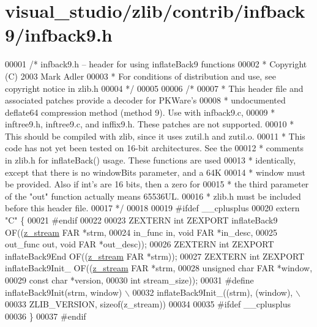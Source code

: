 \hypertarget{visual__studio_2zlib_2contrib_2infback9_2infback9_8h_source}{}\section{visual\+\_\+studio/zlib/contrib/infback9/infback9.h}
\label{visual__studio_2zlib_2contrib_2infback9_2infback9_8h_source}

\begin{DoxyCode}
00001 \textcolor{comment}{/* infback9.h -- header for using inflateBack9 functions}
00002 \textcolor{comment}{ * Copyright (C) 2003 Mark Adler}
00003 \textcolor{comment}{ * For conditions of distribution and use, see copyright notice in zlib.h}
00004 \textcolor{comment}{ */}
00005 
00006 \textcolor{comment}{/*}
00007 \textcolor{comment}{ * This header file and associated patches provide a decoder for PKWare's}
00008 \textcolor{comment}{ * undocumented deflate64 compression method (method 9).  Use with infback9.c,}
00009 \textcolor{comment}{ * inftree9.h, inftree9.c, and inffix9.h.  These patches are not supported.}
00010 \textcolor{comment}{ * This should be compiled with zlib, since it uses zutil.h and zutil.o.}
00011 \textcolor{comment}{ * This code has not yet been tested on 16-bit architectures.  See the}
00012 \textcolor{comment}{ * comments in zlib.h for inflateBack() usage.  These functions are used}
00013 \textcolor{comment}{ * identically, except that there is no windowBits parameter, and a 64K}
00014 \textcolor{comment}{ * window must be provided.  Also if int's are 16 bits, then a zero for}
00015 \textcolor{comment}{ * the third parameter of the "out" function actually means 65536UL.}
00016 \textcolor{comment}{ * zlib.h must be included before this header file.}
00017 \textcolor{comment}{ */}
00018 
00019 \textcolor{preprocessor}{#ifdef \_\_cplusplus}
00020 \textcolor{keyword}{extern} \textcolor{stringliteral}{"C"} \{
00021 \textcolor{preprocessor}{#endif}
00022 
00023 ZEXTERN \textcolor{keywordtype}{int} ZEXPORT inflateBack9 OF((\hyperlink{structz__stream__s}{z\_stream} FAR *strm,
00024                                     in\_func in, \textcolor{keywordtype}{void} FAR *in\_desc,
00025                                     out\_func out, \textcolor{keywordtype}{void} FAR *out\_desc));
00026 ZEXTERN \textcolor{keywordtype}{int} ZEXPORT inflateBack9End OF((\hyperlink{structz__stream__s}{z\_stream} FAR *strm));
00027 ZEXTERN \textcolor{keywordtype}{int} ZEXPORT inflateBack9Init\_ OF((\hyperlink{structz__stream__s}{z\_stream} FAR *strm,
00028                                          \textcolor{keywordtype}{unsigned} \textcolor{keywordtype}{char} FAR *window,
00029                                          \textcolor{keyword}{const} \textcolor{keywordtype}{char} *version,
00030                                          \textcolor{keywordtype}{int} stream\_size));
00031 \textcolor{preprocessor}{#define inflateBack9Init(strm, window) \(\backslash\)}
00032 \textcolor{preprocessor}{        inflateBack9Init\_((strm), (window), \(\backslash\)}
00033 \textcolor{preprocessor}{        ZLIB\_VERSION, sizeof(z\_stream))}
00034 
00035 \textcolor{preprocessor}{#ifdef \_\_cplusplus}
00036 \}
00037 \textcolor{preprocessor}{#endif}
\end{DoxyCode}
